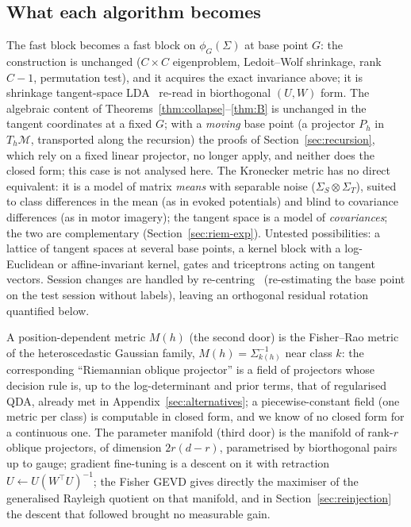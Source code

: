 \documentclass[11pt,a4paper]{article}
\theoremstyle{plain}
\theoremstyle{definition}
\theoremstyle{remark}
\newcommand{\T}{\top}
\begin{document}
\subsection{What each algorithm becomes}
The fast block becomes a fast block on $\phi_G(\Sigma)$ at base point $G$:
the construction is unchanged ($C\times C$ eigenproblem, Ledoit--Wolf
shrinkage, rank $C-1$, permutation test), and it acquires the exact
invariance above; it is shrinkage tangent-space LDA~\cite{barachant2012}
re-read in biorthogonal $(U,W)$ form. The algebraic content of
Theorems~\ref{thm:collapse}--\ref{thm:B} is unchanged in the tangent
coordinates at a fixed $G$; with a \emph{moving} base point (a projector
$P_h$ in $T_h\mathcal M$, transported along the recursion) the proofs of
Section~\ref{sec:recursion}, which rely on a fixed linear projector, no
longer apply, and neither does the closed form; this case is not analysed
here. The Kronecker metric has no direct equivalent: it is a model of matrix
\emph{means} with separable noise ($\Sigma_S\otimes\Sigma_T$), suited to
class differences in the mean (as in evoked potentials) and blind to
covariance differences (as in motor imagery); the tangent space is a model
of \emph{covariances}; the two are complementary (Section~\ref{sec:riem-exp}).
Untested possibilities: a lattice of tangent spaces at several base points,
a kernel block with a log-Euclidean or affine-invariant kernel, gates and
triceptrons acting on tangent vectors. Session changes
are handled by re-centring~\cite{zanini2018} (re-estimating the base point on
the test session without labels), leaving an orthogonal residual rotation quantified below.

A position-dependent metric $M(h)$ (the second door) is the Fisher--Rao
metric of the heteroscedastic Gaussian family, $M(h)=\Sigma_{k(h)}^{-1}$ near
class $k$: the corresponding ``Riemannian oblique projector'' is a field of
projectors whose decision rule is, up to the log-determinant and prior
terms, that of regularised QDA, already met in
Appendix~\ref{sec:alternatives}; a piecewise-constant field (one metric per
class) is computable in closed form, and we know of no closed form for a
continuous one. The parameter
manifold (third door) is the manifold of rank-$r$ oblique projectors, of
dimension $2r(d-r)$, parametrised by biorthogonal pairs up to gauge;
gradient fine-tuning is a descent on it with retraction
$U\leftarrow U(W^\T U)^{-1}$; the Fisher GEVD gives directly the maximiser
of the generalised Rayleigh quotient on that manifold, and in
Section~\ref{sec:reinjection} the descent that followed brought no
measurable gain.
\end{document}
